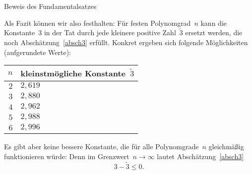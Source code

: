 \documentclass{algblatt}
\begin{document}
\begin{aufgabe}{Beweis des Fundamentalsatzes}
\begin{loesung}
Als Fazit können wir also festhalten: Für festen Polynomgrad~$n$ kann die
Konstante~$3$ in der Tat durch jede kleinere positive Zahl~$\widetilde 3$
ersetzt werden, die noch Abschätzung~\eqref{absch3} erfüllt. Konkret ergeben
sich folgende Möglichkeiten (aufgerundete Werte):
\begin{center}\begin{tabular}{r|l}
  $n$ & kleinstmögliche Konstante~$\widetilde 3$ \\ \hline
  $2$ & $2{,}619$ \\
  $3$ & $2{,}880$ \\
  $4$ & $2{,}962$ \\
  $5$ & $2{,}988$ \\
  $6$ & $2{,}996$
\end{tabular}\end{center}
Es gibt aber keine bessere Konstante, die für alle Polynomgrade~$n$ gleichmäßig
funktionieren würde: Denn im Grenzwert~$n \to \infty$ lautet
Abschätzung~\eqref{absch3}
\[ 3 - \widetilde 3 \leq 0. \]
\end{loesung}
\end{aufgabe}
\end{document}
